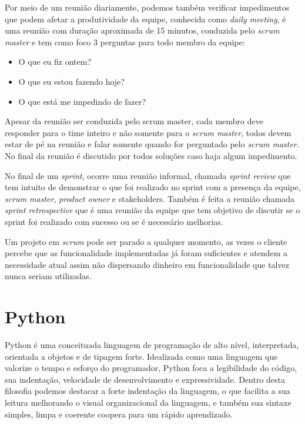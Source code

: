 \documentclass{abnt}
\begin{document}
			Por meio de um reunião diariamente, podemos também verificar impedimentos que podem afetar a produtividade da equipe, conhecida como \emph{daily meeting}, 
			é uma reunião com duração aproximada de 15 minutos,	conduzida pelo \emph{scrum master} e tem como foco 3 perguntas para todo membro da equipe:
				\begin{itemize}
					\item O que eu fiz ontem?
					\item O que eu estou fazendo hoje?
					\item O que está me impedindo de fazer?
				\end{itemize}
			
			Apesar da reunião ser conduzida pelo scrum master, cada membro deve responder para o time inteiro e não somente para o
			\emph{scrum master}, todos devem estar de pé na reunião e falar somente quando for perguntado pelo \emph{scrum master}. No final da
			reunião é discutido por todos soluções caso haja algum impedimento.
			
			No final de um \emph{sprint}, ocorre uma reunião informal, chamada \emph{sprint review} que tem intuito de demonstrar o que foi 
			realizado no sprint com a presença da equipe, \emph{scrum master}, \emph{product owner} e stakeholders. Também é feita a reunião chamada \emph{sprint retrospective}
			que é uma reunião da equipe que tem objetivo de discutir se o sprint foi realizado com sucesso ou se é necessário melhorias.
			
			Um projeto em \emph{scrum} pode ser parado a qualquer momento, as vezes o cliente percebe que as funcionalidade implementadas já foram
			suficientes e atendem a necessidade atual assim não dispersando dinheiro em funcionalidade que talvez nunca seriam utilizadas.
	
	\section{Python}
	
		Python é uma conceituada linguagem de programação de alto nível, interpretada, orientada a objetos e de tipagem forte. Idealizada como uma linguagem que valorize o tempo e esforço do programador, Python foca a legibilidade do código, sua indentação, velocidade de desenvolvimento e expressividade. Dentro desta filosofia 
		podemos destacar a forte indentação da linguagem, o que facilita a sua leitura melhorando o visual organizacional da linguagem, e também sua sintaxe simples, limpa e coerente coopera para um rápido aprendizado.
	
\end{document}
